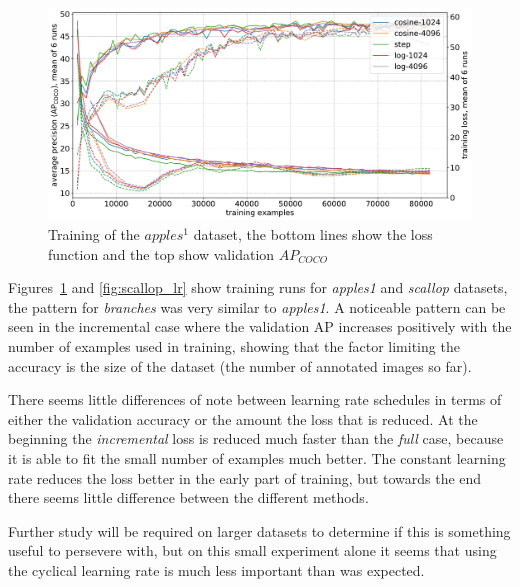 \begin{figure}[h]
  \centering
  \includegraphics[width=1.0\linewidth]{charts/training/lr_schedule/apples.pdf}
  \caption{Training of the $apples^1$ dataset, the bottom lines show the loss function and the top show validation $AP_{COCO}$}  
  \label{fig:apple_lr}
\end{figure}

Figures~\ref{fig:apple_lr} and \ref{fig:scallop_lr} show training runs for \emph{apples1} and \emph{scallop} datasets, the pattern for \emph{branches} was very similar to \emph{apples1}. A noticeable pattern can be seen in the incremental case where the validation \gls{AP} increases positively with the number of examples used in training, showing that the factor limiting the accuracy is the size of the dataset (the number of annotated images so far).

There seems little differences of note between learning rate schedules in terms of either the validation accuracy or the amount the loss that is reduced. At the beginning the \emph{incremental} loss is reduced much faster than the \emph{full} case, because it is able to fit the small number of examples much better. The constant learning rate reduces the loss better in the early part of training, but towards the end there seems little difference between the different methods. 

Further study will be required on larger datasets to determine if this is something useful to persevere with, but on this small experiment alone it seems that using the cyclical learning rate is much less important than was expected.



